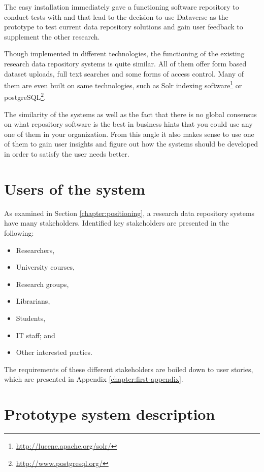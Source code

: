 The easy installation immediately gave a functioning software repository to
conduct tests with and that lead to the decision to use Dataverse as the
prototype to test current data repository solutions and gain user feedback to
supplement the other research.

Though implemented in different technologies, the functioning of the existing
research data repository systems is quite similar. All of them offer form based
dataset uploads, full text searches and some forms of access control. Many of
them are even built on same technologies, such as Solr indexing
software\footnote{\label{solr}\url{http://lucene.apache.org/solr/}} or
postgreSQL\footnote{\label{postgre}\url{http://www.postgresql.org/}}.

The similarity of the systems as well as the fact that there is no global
consensus on what repository software is the best in business hints that you
could use any one of them in your organization. From this angle it also makes
sense to use one of them to gain user insights and figure out how the systems
should be developed in order to satisfy the user needs better.

\section{Users of the system}
\label{sec:users}

As examined in Section \ref{chapter:positioning}, a research data repository
systems have many stakeholders. Identified key stakeholders are presented in
the following:

\begin{itemize}
    \item Researchers,
    \item University courses,
    \item Research groups,
    \item Librarians,
    \item Students,
    \item IT staff; and
    \item Other interested parties.
\end{itemize}

The requirements of these different stakeholders are boiled down to user
stories, which are presented in Appendix \ref{chapter:first-appendix}.

\section{Prototype system description}
\label{sec:system_description}

